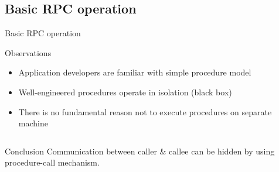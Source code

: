 \subsection{Basic RPC operation}
\begin{slide}{Basic RPC operation}
  \begin{block}{Observations}
    \begin{itemize}\tightlist
    \item Application developers are familiar with simple procedure model
    \item Well-engineered procedures operate in isolation (black box)
    \item There is no fundamental reason not to execute procedures on separate machine
    \end{itemize}
  \end{block}
  \begin{columns}
    \begin{column}{0.5\textwidth}
      \begin{alertblock}{Conclusion} 
        Communication between caller \& callee can be hidden by using procedure-call mechanism.
      \end{alertblock}
    \end{column}
    \begin{column}{0.5\textwidth}
    \end{column}
  \end{columns}
\end{slide}
